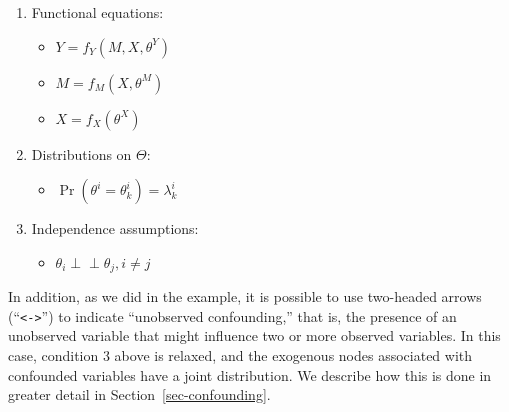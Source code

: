 \documentclass[
  11pt,
  article]{jss}
\providecommand{\tightlist}{%
  \setlength{\itemsep}{0pt}\setlength{\parskip}{0pt}}\usepackage{longtable,booktabs,array}
\begin{document}
\begin{enumerate}
\def\labelenumi{\arabic{enumi}.}
\item
  Functional equations:

  \begin{itemize}
  \tightlist
  \item
    \(Y = f_Y(M, X, \theta^Y)\)
  \item
    \(M = f_M(X, \theta^M)\)
  \item
    \(X = f_X(\theta^X)\)
  \end{itemize}
\item
  Distributions on \(\Theta\):

  \begin{itemize}
  \tightlist
  \item
    \(\Pr(\theta^i = \theta^i_k) = \lambda^i_k\)
  \end{itemize}
\item
  Independence assumptions:

  \begin{itemize}
  \tightlist
  \item
    \(\theta_i \perp\!\!\! \perp \theta_j, i\neq j\)
  \end{itemize}
\end{enumerate}

In addition, as we did in the \citet{chickering_clinicians_1996}
example, it is possible to use two-headed arrows
(``\texttt{\textless{}-\textgreater{}}'') to indicate ``unobserved
confounding,'' that is, the presence of an unobserved variable that
might influence two or more observed variables. In this case, condition
3 above is relaxed, and the exogenous nodes associated with confounded
variables have a joint distribution. We describe how this is done in
greater detail in Section~\ref{sec-confounding}.
\end{document}
